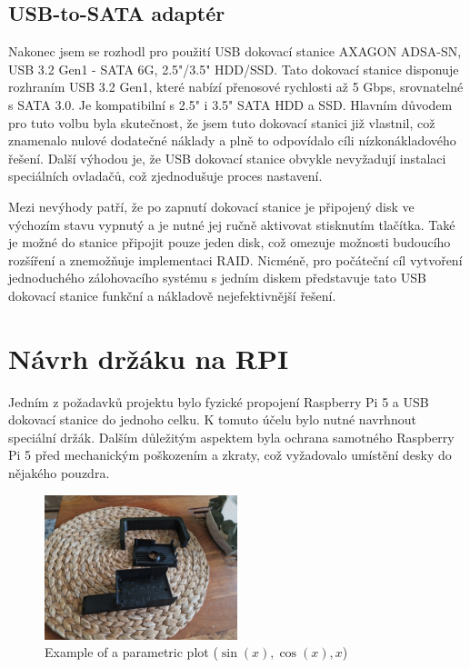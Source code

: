 \documentclass[a4paper,12pt, oneside]{book}
\begin{document}
\subsection{USB-to-SATA adaptér}
Nakonec jsem se rozhodl pro použití USB dokovací stanice AXAGON ADSA-SN, USB 3.2
Gen1 - SATA 6G, 2.5"/3.5" HDD/SSD. Tato dokovací stanice
disponuje rozhraním USB 3.2 Gen1, které nabízí přenosové rychlosti až 5 Gbps,
srovnatelné s SATA 3.0. Je kompatibilní s 2.5" i 3.5" SATA HDD a SSD. Hlavním
důvodem pro tuto volbu byla skutečnost, že jsem tuto dokovací stanici již
vlastnil, což znamenalo nulové dodatečné náklady a plně to
odpovídalo cíli nízkonákladového řešení. Další výhodou je, že USB dokovací
stanice obvykle nevyžadují instalaci speciálních ovladačů,
což zjednodušuje proces nastavení.

Mezi nevýhody patří, že po zapnutí dokovací stanice je připojený disk ve
výchozím stavu vypnutý a je nutné jej ručně aktivovat stisknutím tlačítka. Také
je možné do stanice připojit pouze jeden disk, což omezuje možnosti budoucího
rozšíření a znemožňuje implementaci RAID. Nicméně, pro počáteční cíl vytvoření
jednoduchého zálohovacího systému s jedním diskem představuje tato USB dokovací
stanice funkční a nákladově nejefektivnější řešení.

\section{Návrh držáku na RPI}

Jedním z požadavků projektu bylo fyzické propojení Raspberry Pi 5 a USB dokovací
stanice do jednoho celku. K tomuto účelu bylo nutné navrhnout speciální držák.
Dalším důležitým aspektem byla ochrana samotného Raspberry Pi 5 před mechanickým
poškozením a zkraty, což vyžadovalo umístění desky do nějakého pouzdra.

\begin{figure}[h]
\caption{Example of a parametric plot ($\sin (x), \cos(x), x$)}
\centering
\includegraphics[width=0.5\textwidth]{img/dily-zvlast.jpg}
\end{figure}
\end{document}
